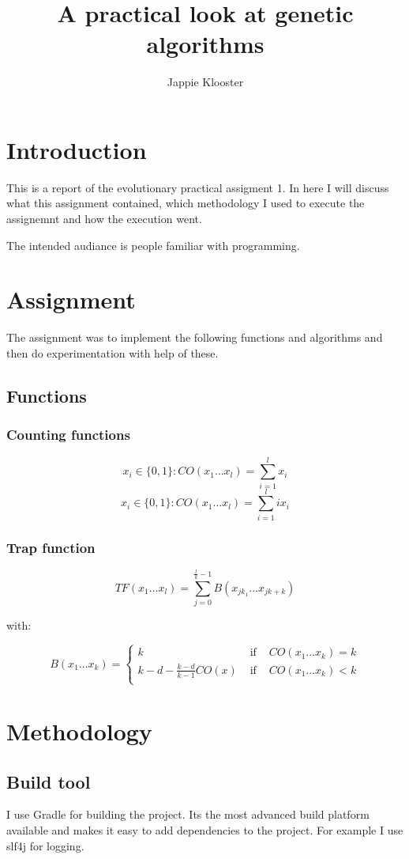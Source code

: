 \documentclass{article}
\begin{document}
\author{Jappie Klooster}
\title{A practical look at genetic algorithms}
\maketitle

\section{Introduction}
This is a report of the evolutionary practical assigment 1.
In here I will discuss what this assignment contained, which
methodology I used to execute the assignemnt and how the execution
went.

The intended audiance is people familiar with programming.

\section{Assignment}
The assignment was to implement the following functions and algorithms and
then do experimentation with help of these.

\subsection{Functions}
\subsubsection{Counting functions}
\[x_i \in \{0,1\}:CO(x_1\dots x_l)=\sum^l_{i=1}x_i\]
\[x_i \in \{0,1\}:CO(x_1\dots x_l)=\sum^l_{i=1}i x_i\]
\subsubsection{Trap function}
\[TF(x_1\dots x_l) = \sum^{\frac{l}{k}-1}_{j=0}B(x_{jk_1}\dots x_{jk+k})\]

with:

\[B(x_1\dots x_k)=\left\{
	\begin{matrix}
		k & \mbox{ if } &   CO(x_1\dots x_k) = k \\
		k - d - \frac{k-d}{k-1} CO(x) & \mbox{ if } & CO(x_1\dots x_k) < k \\
	\end{matrix}
\right. \]
\section{Methodology}
\subsection{Build tool}
I use Gradle for building the project. Its the most advanced build platform
available and makes it easy to add dependencies to the project.
For example I use slf4j for logging.
\end{document}
